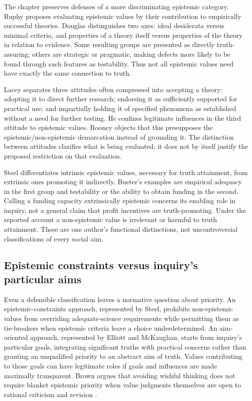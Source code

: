 The chapter preserves defenses of a more discriminating epistemic category.
Ruphy proposes evaluating epistemic values by their contribution to
empirically successful theories. Douglas distinguishes two axes: ideal
desiderata versus minimal criteria, and properties of a theory itself
versus properties of the theory in relation to evidence. Some resulting
groups are presented as directly truth-assuring; others are strategic or
pragmatic, making defects more likely to be found through such features
as testability. Thus not all epistemic values need have exactly the same
connection to truth.

Lacey separates three attitudes often compressed into accepting a theory:
adopting it to direct further research; endorsing it as sufficiently
supported for practical use; and impartially holding it of specified
phenomena as established without a need for further testing. He confines
legitimate influences in the third attitude to epistemic values. Rooney
objects that this presupposes the epistemic/non-epistemic demarcation
instead of grounding it. The distinction between attitudes clarifies
what is being evaluated; it does not by itself justify the proposed
restriction on that evaluation.

Steel differentiates intrinsic epistemic values, necessary for truth
attainment, from extrinsic ones promoting it indirectly. Bueter's examples
are empirical adequacy in the first group and testability or the ability
to obtain funding in the second. Calling a funding capacity extrinsically
epistemic concerns its enabling role in inquiry, not a general claim that
profit incentives are truth-promoting. Under the reported account a
non-epistemic value is irrelevant or harmful to truth attainment. These
are one author's functional distinctions, not uncontroversial classifications
of every social aim.

\subsection{Epistemic constraints versus inquiry's particular aims}

Even a defensible classification leaves a normative question about priority.
An epistemic-constraints approach, represented by Steel, prohibits
non-epistemic values from overriding adequate-science requirements while
permitting them as tie-breakers when epistemic criteria leave a choice
underdetermined. An aim-oriented approach, represented by Elliott and
McKaughan, starts from inquiry's particular goals, integrating significant
truths with practical concerns rather than granting an unqualified priority
to an abstract aim of truth. Values contributing to those goals can have
legitimate roles if goals and influences are made maximally transparent.
Brown argues that avoiding wishful thinking does not require blanket
epistemic priority when value judgments themselves are open to rational
criticism and revision
\cite[p.~761]{Bueter2021ValueFreedom}.

